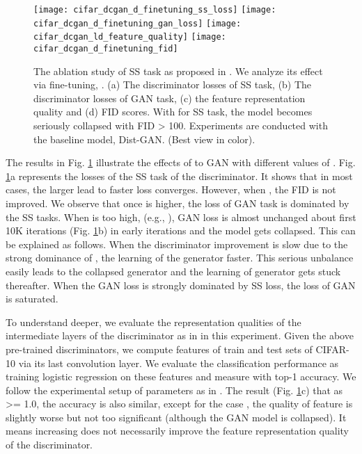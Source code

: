 \documentclass{article}
\begin{document}
\begin{figure}
  \centering
\texttt{[image: cifar\_dcgan\_d\_finetuning\_ss\_loss]}
  \texttt{[image: cifar\_dcgan\_d\_finetuning\_gan\_loss]}
\texttt{[image: cifar\_dcgan\_ld\_feature\_quality]}
  \texttt{[image: cifar\_dcgan\_d\_finetuning\_fid]}
  \caption{The ablation study of SS task  as proposed in \cite{chen-arxiv-2018}. We analyze its effect via  fine-tuning, . (a) The discriminator losses of SS task, (b) The discriminator losses of GAN task, (c) the feature representation quality and (d) FID scores. With  for SS task, the model becomes seriously collapsed with FID > 100. Experiments are conducted with the baseline model, Dist-GAN. (Best view in color).}
  \label{ss_finetuning_dcgan}
\end{figure}
 
The results in Fig. \ref{ss_finetuning_dcgan} illustrate the effects of  to GAN with different values of . Fig. \ref{ss_finetuning_dcgan}a represents the losses of the SS task of the discriminator. It shows that in most cases, the larger  lead to faster  loss converges. However, when , the FID is not improved. We observe that once  is higher, the loss of GAN task is dominated by the SS tasks. When  is too high, (e.g., ), GAN loss is almost unchanged about first 10K iterations (Fig. \ref{ss_finetuning_dcgan}b) in early iterations and the model gets collapsed. 
This can be explained as follows.
When the discriminator improvement is slow due to the strong dominance of , the learning of the generator faster. This serious unbalance easily leads to the collapsed generator and the learning of generator gets stuck thereafter. When the GAN loss is strongly dominated by SS loss, the loss of GAN is saturated.

To understand deeper, we evaluate the representation qualities of the intermediate layers of the discriminator as in  \cite{chen-arxiv-2018} in this experiment. Given the above pre-trained discriminators, we compute features of train and test sets of CIFAR-10 via its last convolution layer. We evaluate the classification performance as training logistic regression on these features and measure with top-1 accuracy. We follow the experimental setup of parameters as in \cite{chen-arxiv-2018}. The result (Fig. \ref{ss_finetuning_dcgan}c) that as  >= 1.0, the accuracy is also similar, except for the case , the quality of feature is slightly worse but not too significant (although the GAN model is collapsed). It means increasing  does not necessarily improve the feature representation quality of the discriminator. 
\end{document}
